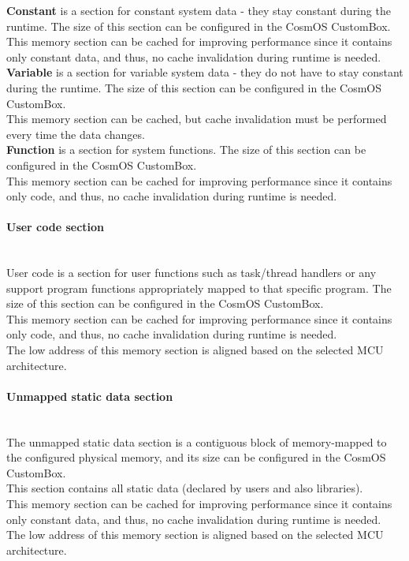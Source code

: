 \textbf{Constant} is a section for constant system data - they stay constant during the runtime. The size of this section can be configured in the CosmOS CustomBox.\\
\indent This memory section can be cached for improving performance since it contains only constant data, and thus, no cache invalidation during runtime is needed. \\

\textbf{Variable} is a section for variable system data - they do not have to stay constant during the runtime. The size of this section can be configured in the CosmOS CustomBox.\\
\indent This memory section can be cached, but cache invalidation must be performed every time the data changes.\\

\textbf{Function} is a section for system functions. The size of this section can be configured in the CosmOS CustomBox.\\
\indent This memory section can be cached for improving performance since it contains only code, and thus, no cache invalidation during runtime is needed.

\paragraph{User code section}\label{userCodeMemoryMapping}\mbox{}\\
\indent User code is a section for user functions such as task/thread handlers or any support program functions appropriately mapped to that specific program. The size of this section can be configured in the CosmOS CustomBox.\\
\indent This memory section can be cached for improving performance since it contains only code, and thus, no cache invalidation during runtime is needed.\\
\indent The low address of this memory section is aligned based on the selected \ac{MCU} architecture.

\paragraph{Unmapped static data section}\label{staticDataMemoryMapping}\mbox{}\\
\indent The unmapped static data section is a contiguous block of memory-mapped to the configured physical memory, and its size can be configured in the CosmOS CustomBox.\\
This section contains all static data (declared by users and also libraries).\\
\indent This memory section can be cached for improving performance since it contains only constant data, and thus, no cache invalidation during runtime is needed. \\
\indent The low address of this memory section is aligned based on the selected \ac{MCU} architecture.


